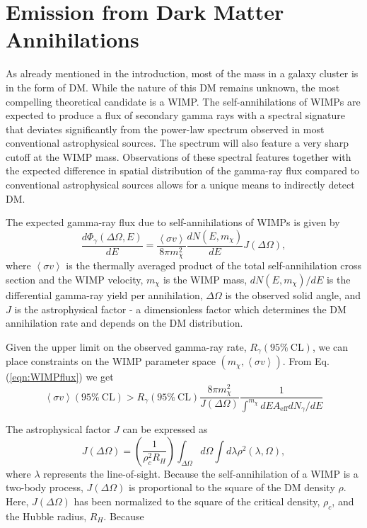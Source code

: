 \documentclass[12pt,manuscript]{aastex}
\newcommand{\expval}[1]{\left\langle #1 \right\rangle}
\begin{document}
\section{Emission from Dark Matter Annihilations}
As already mentioned in the introduction, most of the mass in a galaxy cluster is in the form of DM. While the nature of this DM remains unknown, the most compelling theoretical candidate is a WIMP. The self-annihilations of WIMPs are expected to produce a flux of secondary gamma rays with a spectral signature that deviates significantly from the power-law spectrum observed in most conventional astrophysical sources. The spectrum will also feature a very sharp cutoff at the WIMP mass. Observations of these spectral features together with the expected difference in spatial distribution of the gamma-ray flux compared to conventional astrophysical sources allows for a unique means to indirectly detect DM.

The expected gamma-ray flux due to self-annihilations of WIMPs is given by 
\begin{equation}
\frac{d\Phi_{\gamma}(\Delta\Omega,E)}{dE}=\frac{\expval{\sigma v}}{8\pi m_{\chi}^{2}}\frac{dN(E,m_{\chi})}{dE} J(\Delta\Omega),
\label{eqn:WIMPflux}
\end{equation}
where $\expval{\sigma v}$ is the thermally averaged product of the total self-annihilation cross section and the WIMP velocity, $m_{\chi}$ is the WIMP mass, $dN(E,m_{\chi})/dE$ is the differential gamma-ray yield per annihilation, $\Delta\Omega$ is the observed solid angle, and $J$ is the astrophysical factor - a dimensionless factor which determines the DM annihilation rate and depends on the DM distribution.

Given the upper limit on the observed gamma-ray rate, $R_{\gamma}(95\%\ \mathrm{CL})$, we can place constraints on the WIMP parameter space $(m_{\chi}, \expval{\sigma v})$. From Eq. (\ref{eqn:WIMPflux}) we get
\begin{equation}
\expval{\sigma v}(95\%\ \mathrm{CL}) > R_{\gamma}(95\%\ \mathrm{CL}) \frac{8\pi m_{\chi}^{2}}{J(\Delta\Omega)}\frac{1}{\int^{m_{\chi}} dE A_{\mathrm{eff}}dN_{\gamma}/dE}
\end{equation}

The astrophysical factor $J$ can be expressed as
\begin{equation}
J(\Delta\Omega)=\left(\frac{1}{\rho_{c}^{2}R_{H}}\right) \int_{\Delta\Omega}d\Omega\int d\lambda \rho^{2}(\lambda,\Omega),
\end{equation}
where $\lambda$ represents the line-of-sight. Because the self-annihilation of a WIMP is a two-body process, $J(\Delta\Omega)$ is proportional to the square of the DM density $\rho$. Here, $J(\Delta\Omega)$ has been normalized to the square of the critical density, $\rho_{c}$, and the Hubble radius, $R_{H}$. Because 
\end{document}
